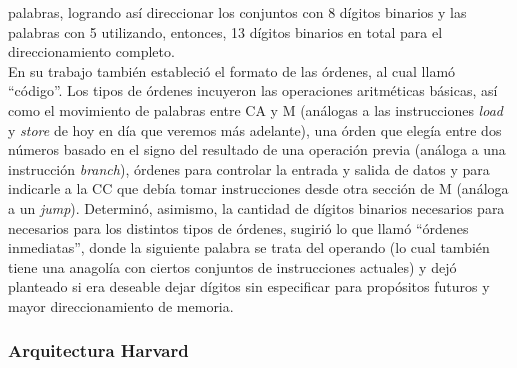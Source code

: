 palabras, logrando así direccionar los conjuntos con 8 dígitos binarios y las
palabras con 5 utilizando, entonces, 13 dígitos binarios en total para el
direccionamiento completo.\\
En su trabajo también estableció el formato de las órdenes, al cual llamó
``código''. Los tipos de órdenes incuyeron las operaciones aritméticas básicas,
así como el movimiento de palabras entre CA y M (análogas a las instrucciones
\emph{load} y \emph{store} de hoy en día que veremos más adelante), una órden
que elegía entre dos números basado en el signo del resultado de una operación
previa (análoga a una instrucción \emph{branch}), órdenes para controlar la
entrada y salida de datos y para indicarle a la CC que debía tomar instrucciones
desde otra sección de M (análoga a un \emph{jump}). Determinó, asimismo, la
cantidad de dígitos binarios necesarios para necesarios para los distintos tipos
de órdenes, sugirió lo que llamó ``órdenes inmediatas'', donde la siguiente
palabra  se trata del operando (lo cual también tiene una anagolía con ciertos
conjuntos de instrucciones actuales) y dejó planteado si era deseable dejar
dígitos sin especificar para propósitos futuros y mayor direccionamiento de
memoria.

\subsubsection{Arquitectura Harvard}
\label{subsubsec:theory-modern-memory_access-harvard}

